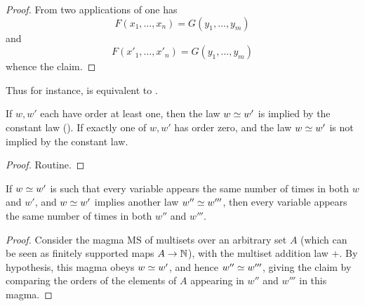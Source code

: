 \begin{proof}
  From two applications of  one has
  $$ F(x_1,\dots,x_n) = G(y_1,\dots,y_m)$$
  and
  $$ F(x'_1,\dots,x'_n) = G(y_1,\dots,y_m)$$
  whence the claim.
\end{proof}

Thus for instance,  is equivalent to .

\begin{theorem}\label{constant-impl}
  If $w, w'$ each have order at least one, then the law $w \simeq w'$ is implied by the constant law (). If exactly one of $w, w'$ has order zero, and the law $w \simeq w'$ is not implied by the constant law.
\end{theorem}

\begin{proof}
  Routine.
\end{proof}

\begin{theorem}\label{variable-impl}\leanok
  If $w \simeq w'$ is such that every variable appears the same number of times in both $w$ and $w'$, and $w \simeq w'$ implies another law $w'' \simeq w'''$, then every variable appears the same number of times in both $w''$ and $w'''$.
\end{theorem}

\begin{proof}
  Consider the magma $\mathrm{MS}$ of multisets over an arbitrary set $A$ (which can be seen as finitely supported maps $A\rightarrow \mathbb{N}$), with the multiset addition law $+$. By hypothesis, this magma obeys $w \simeq w'$, and hence $w'' \simeq w'''$, giving the claim by comparing the orders of the elements of $A$ appearing in $w''$ and $w'''$ in this magma.
\end{proof}
